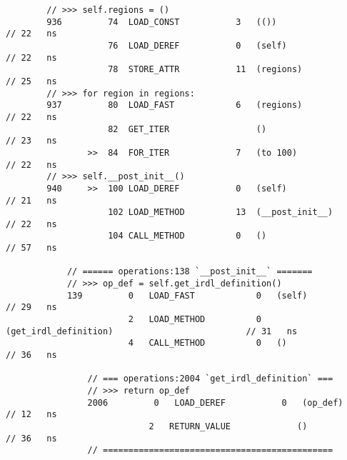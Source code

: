 \begin{code}
\begin{verbatim}
        // >>> self.regions = ()
        936         74  LOAD_CONST           3   (())                                               // 22   ns
                    76  LOAD_DEREF           0   (self)                                             // 22   ns
                    78  STORE_ATTR           11  (regions)                                          // 25   ns
        // >>> for region in regions:
        937         80  LOAD_FAST            6   (regions)                                          // 22   ns
                    82  GET_ITER                 ()                                                 // 23   ns
                >>  84  FOR_ITER             7   (to 100)                                           // 22   ns
        // >>> self.__post_init__()
        940     >>  100 LOAD_DEREF           0   (self)                                             // 21   ns
                    102 LOAD_METHOD          13  (__post_init__)                                    // 22   ns
                    104 CALL_METHOD          0   ()                                                 // 57   ns

            // ====== operations:138 `__post_init__` =======
            // >>> op_def = self.get_irdl_definition()
            139         0   LOAD_FAST            0   (self)                                         // 29   ns
                        2   LOAD_METHOD          0   (get_irdl_definition)                          // 31   ns
                        4   CALL_METHOD          0   ()                                             // 36   ns

                // === operations:2004 `get_irdl_definition` ===
                // >>> return op_def
                2006         0   LOAD_DEREF           0   (op_def)                                  // 12   ns
                            2   RETURN_VALUE             ()                                         // 36   ns
                // =============================================


\end{verbatim}
\end{code}
